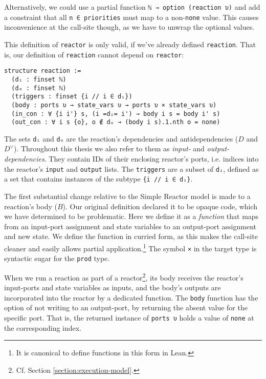 Alternatively, we could use a partial function \lstinline{ℕ → option (reaction υ)} and add a constraint that all \lstinline{n ∈ priorities} must map to a non-\lstinline{none} value.
This causes inconvenience at the call-site though, as we have to unwrap the optional values.    

\vspace{3mm}

\noindent This definition of \lstinline{reactor} is only valid, if we've already defined \lstinline{reaction}.
That is, our definition of \lstinline{reaction} cannot depend on \lstinline{reactor}:

\begin{lstlisting}
structure reaction :=
  (dᵢ : finset ℕ) 
  (dₒ : finset ℕ)
  (triggers : finset {i // i ∈ dᵢ})
  (body : ports υ → state_vars υ → ports υ × state_vars υ)
  (in_con : ∀ {i i'} s, (i =dᵢ= i') → body i s = body i' s)
  (out_con : ∀ i s {o}, o ∉ dₒ → (body i s).1.nth o = none) 
\end{lstlisting}

\noindent The sets \lstinline{dᵢ} and \lstinline{dₒ} are the reaction's dependencies and antidependencies ($D$ and $D^\vee$).
Throughout this thesis we also refer to them as \emph{input-} and \emph{output-dependencies}.
They contain IDs of their enclosing reactor's ports, i.e. indices into the reactor's \lstinline{input} and \lstinline{output} lists.
The \lstinline{triggers} are a subset of \lstinline{dᵢ}, defined as a set that contains instances of the subtype \lstinline|{i // i ∈ dᵢ}|.

The first substantial change relative to the Simple Reactor model is made to a reaction's body ($B$).
Our original definition declared it to be opaque code, which we have determined to be problematic.
Here we define it as a \emph{function} that maps from an input-port assignment and state variables to an output-port assignment and new state.
We define the function in curried form, as this makes the call-site cleaner and easily allows partial application.\footnote{
  It is canonical to define functions in this form in Lean.
}
The symbol \lstinline{×} in the target type is syntactic sugar for the \lstinline{prod} type.

When we run a reaction as part of a reactor\footnote{Cf. Section \ref{section:execution-model}.}, its body receives the reactor's input-ports and state variables as inputs, and the body's outputs are incorporated into the reactor by a dedicated function.
The \lstinline{body} function has the option of not writing to an output-port, by returning the absent value for the specific port.
That is, the returned instance of \lstinline{ports υ} holds a value of \lstinline{none} at the corresponding index.

